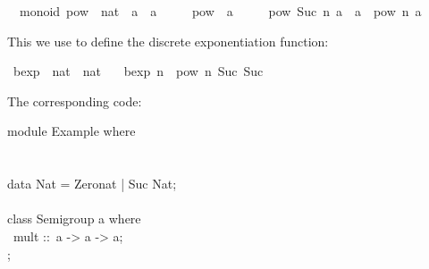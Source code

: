 \begin{isabellebody}
%
\isadelimquote
%
\endisadelimquote
%
\isatagquote
{}\isamarkupfalse%
\ {\isacharparenleft}\ monoid{\isacharparenright}\ pow\ {\isacharcolon}{\isacharcolon}\ {\isachardoublequoteopen}nat\ {\isasymRightarrow}\ {\isacharprime}a\ {\isasymRightarrow}\ {\isacharprime}a{\isachardoublequoteclose}\ \isanewline
\ \ \ \ {\isachardoublequoteopen}pow\ {}\ a\ {\isacharequal}\ {\isasymone}{\isachardoublequoteclose}\isanewline
\ \ {\isacharbar}\ {\isachardoublequoteopen}pow\ {\isacharparenleft}Suc\ n{\isacharparenright}\ a\ {\isacharequal}\ a\ {\isasymotimes}\ pow\ n\ a{\isachardoublequoteclose}%
\endisatagquote
{\isafoldquote}%
%
\isadelimquote
%
\endisadelimquote
%
\begin{isamarkuptext}%
\noindent This we use to define the discrete exponentiation function:%
\end{isamarkuptext}%
\isamarkuptrue%
%
\isadelimquote
%
\endisadelimquote
%
\isatagquote
{}\isamarkupfalse%
\ bexp\ {\isacharcolon}{\isacharcolon}\ {\isachardoublequoteopen}nat\ {\isasymRightarrow}\ nat{\isachardoublequoteclose}\ \isanewline
\ \ {\isachardoublequoteopen}bexp\ n\ {\isacharequal}\ pow\ n\ {\isacharparenleft}Suc\ {\isacharparenleft}Suc\ {}{\isacharparenright}{\isacharparenright}{\isachardoublequoteclose}%
\endisatagquote
{\isafoldquote}%
%
\isadelimquote
%
\endisadelimquote
%
\begin{isamarkuptext}%
\noindent The corresponding code:%
\end{isamarkuptext}%
\isamarkuptrue%
%
\isadelimquote
%
\endisadelimquote
%
\isatagquote
%
\begin{isamarkuptext}%
\isatypewriter%
\noindent%
\hspace*{0pt}module Example where {}\\
\hspace*{0pt}\\
\hspace*{0pt}\\
\hspace*{0pt}data Nat = Zero{}nat | Suc Nat;\\
\hspace*{0pt}\\
\hspace*{0pt}class Semigroup a where {}\\
\hspace*{0pt} ~mult ::~a -> a -> a;\\
\hspace*{0pt}{\char125};\\

\end{isamarkuptext}
\end{isabellebody}
